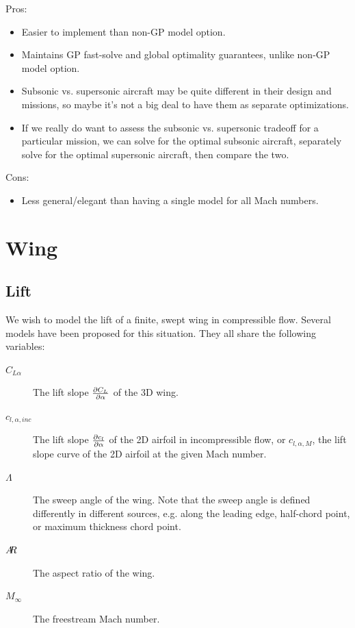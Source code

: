 \documentclass[12pt]{article}
\newcommand{\ar}{A\mkern-6mu R}
\begin{document}
Pros:
\begin{itemize}
    \item Easier to implement than non-GP model option.
    \item Maintains GP fast-solve and global optimality guarantees, unlike non-GP model option.
    \item Subsonic vs. supersonic aircraft may be quite different in their design and missions, so maybe it's not a big deal to have them as separate optimizations.
    \item If we really do want to assess the subsonic vs. supersonic tradeoff for a particular mission, we can solve for the optimal subsonic aircraft, separately solve for the optimal supersonic aircraft, then compare the two.
\end{itemize}

Cons:
\begin{itemize}
    \item Less general/elegant than having a single model for all Mach numbers.
\end{itemize}


\section{Wing}
\subsection{Lift}
We wish to model the lift of a finite, swept wing in compressible flow.
Several models have been proposed for this situation.
They all share the following variables:

\begin{description}
    \item[$C_{L\alpha}$] The lift slope $\pdv{C_L}{\alpha}$ of the 3D wing.
    \item[$c_{l, \alpha, inc}$] The lift slope $\pdv{c_l}{\alpha}$ of the 2D airfoil in incompressible flow, or $c_{l, \alpha, M}$, the lift slope curve of the 2D airfoil at the given Mach number.
    \item[$\Lambda$] The sweep angle of the wing. Note that the sweep angle is defined differently in different sources, e.g. along the leading edge, half-chord point, or maximum thickness chord point.
    \item[$\ar$] The aspect ratio of the wing.
    \item[$M_{\infty}$] The freestream Mach number.
\end{description}
\end{document}
